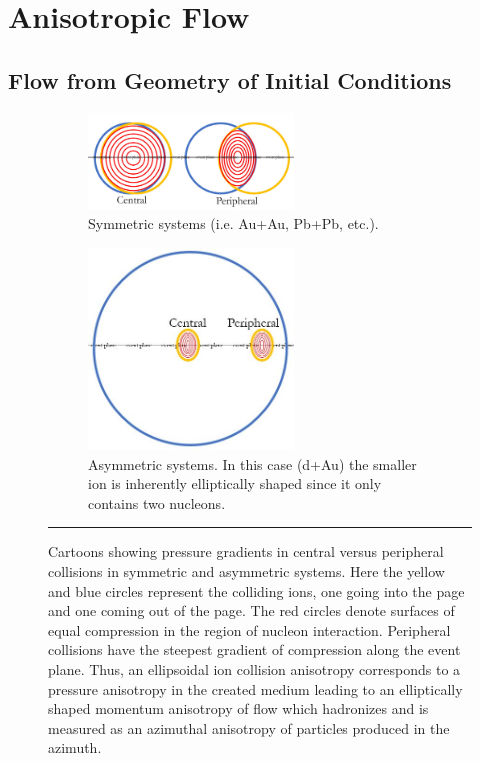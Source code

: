 
\chapter{Anisotropic Flow} %
\label{sect:flow}
\section{Flow from Geometry of Initial Conditions}
\begin{figure}[p]
  \centering
  \begin{subfigure}[h]{1\textwidth}
  \centering
    \includegraphics[width=0.6\textwidth]{Figures/pressuregradientsvscent.jpg}
    \caption{Symmetric systems (i.e. Au+Au, Pb+Pb, etc.).}
    \label{fig:pgradauau}
   \end{subfigure}
   \begin{subfigure}[h]{0.8\textwidth}
  \centering
    \includegraphics[width=0.6\textwidth]{Figures/pressuregradientsdau.jpg}
    \caption{Asymmetric systems. In this case (d+Au) the smaller ion is inherently elliptically shaped since it only contains two nucleons.}
   \label{fig:pgraddau}
   \end{subfigure}
        \rule{35em}{0.5pt}
  \caption[A cartoon showing pressure gradients in central versus peripheral collisions.]{Cartoons showing pressure gradients in central versus peripheral collisions in symmetric and asymmetric systems. Here the yellow and blue circles represent the colliding ions, one going into the page and one coming out of the page. The red circles denote surfaces of equal compression in the region of nucleon interaction. Peripheral collisions have the steepest gradient of compression along the event plane. Thus, an ellipsoidal ion collision anisotropy corresponds to a pressure anisotropy in the created medium leading to an elliptically shaped momentum anisotropy of flow which hadronizes and is measured as an azimuthal anisotropy of particles produced in the azimuth.}

\end{figure}

